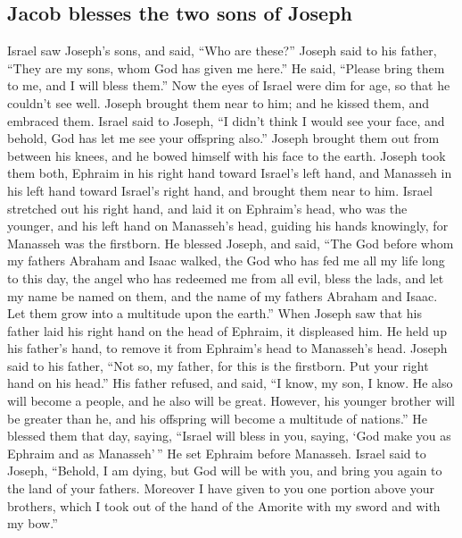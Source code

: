 \hypertarget{jacob-blesses-the-two-sons-of-joseph}{%
\subsection{Jacob blesses the two sons of
Joseph}\label{jacob-blesses-the-two-sons-of-joseph}}

 Israel saw Joseph's sons, and said, ``Who are these?''
 Joseph said to his father, ``They are my sons, whom God
has given me here.'' He said, ``Please bring them to me, and I will
bless them.''  Now the eyes of Israel were dim for age,
so that he couldn't see well. Joseph brought them near to him; and he
kissed them, and embraced them.  Israel said to Joseph,
``I didn't think I would see your face, and behold, God has let me see
your offspring also.''  Joseph brought them out from
between his knees, and he bowed himself with his face to the earth.
 Joseph took them both, Ephraim in his right hand toward
Israel's left hand, and Manasseh in his left hand toward Israel's right
hand, and brought them near to him.  Israel stretched out
his right hand, and laid it on Ephraim's head, who was the younger, and
his left hand on Manasseh's head, guiding his hands knowingly, for
Manasseh was the firstborn.  He blessed Joseph, and said,
``The God before whom my fathers Abraham and Isaac walked, the God who
has fed me all my life long to this day,  the angel who
has redeemed me from all evil, bless the lads, and let my name be named
on them, and the name of my fathers Abraham and Isaac. Let them grow
into a multitude upon the earth.''  When Joseph saw that
his father laid his right hand on the head of Ephraim, it displeased
him. He held up his father's hand, to remove it from Ephraim's head to
Manasseh's head.  Joseph said to his father, ``Not so, my
father, for this is the firstborn. Put your right hand on his head.''
 His father refused, and said, ``I know, my son, I know.
He also will become a people, and he also will be great. However, his
younger brother will be greater than he, and his offspring will become a
multitude of nations.''  He blessed them that day,
saying, ``Israel will bless in you, saying, `God make you as Ephraim and
as Manasseh'\,'' He set Ephraim before Manasseh.  Israel
said to Joseph, ``Behold, I am dying, but God will be with you, and
bring you again to the land of your fathers.  Moreover I
have given to you one portion above your brothers, which I took out of
the hand of the Amorite with my sword and with my bow.''

